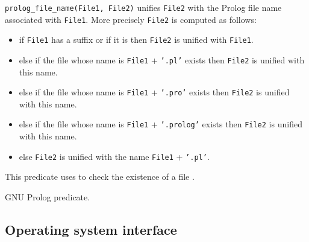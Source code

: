 \Description

\texttt{prolog\_file\_name(File1, File2)} unifies \texttt{File2} with the
Prolog file name associated with \texttt{File1}. More precisely \texttt{File2}
is computed as follows:

\begin{itemize}

\item if \texttt{File1} has a suffix or if it is  then
\texttt{File2} is unified with \texttt{File1}.

\item else if the file whose name is \texttt{File1} + \texttt{'.pl'} exists
then \texttt{File2} is unified with this name.

\item else if the file whose name is \texttt{File1} + \texttt{'.pro'} exists
then \texttt{File2} is unified with this name.

\item else if the file whose name is \texttt{File1} + \texttt{'.prolog'} exists
then \texttt{File2} is unified with this name.

\item else \texttt{File2} is unified with the name \texttt{File1} +
\texttt{'.pl'}.

\end{itemize}

This predicate uses  to check the existence
of a file .

\begin{PlErrors}





\end{PlErrors}

\Portability

GNU Prolog predicate.

\subsection{Operating system interface}

